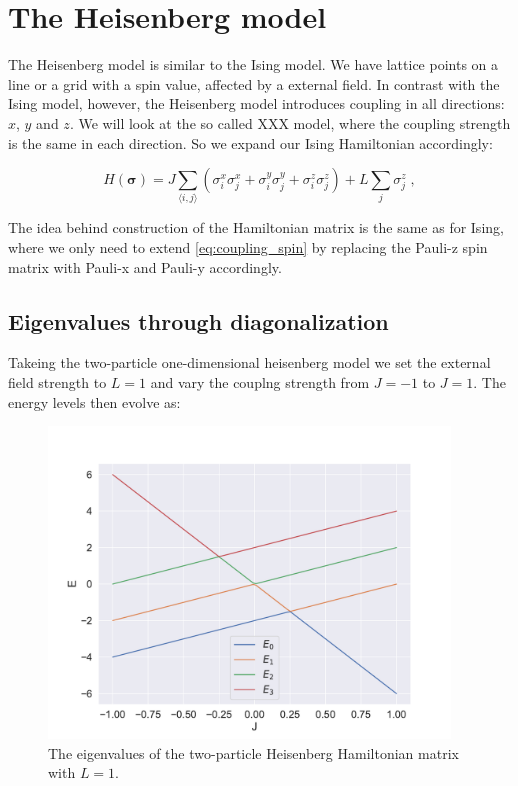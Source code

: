 \section{The Heisenberg model}

The Heisenberg model is similar to the Ising model. We have lattice points on a line or a grid with a spin value, affected by a external field. In contrast with the Ising model, however, the Heisenberg model introduces coupling in all directions: $x$, $y$ and $z$. We will look at the so called XXX model, where the coupling strength is the same in each direction. So we expand our Ising Hamiltonian accordingly:

\begin{equation}
  H(\boldsymbol{\sigma}) =J\sum_{\langle i,j\rangle} \left ( \sigma^x_i\sigma^x_j + \sigma^y_i\sigma^y_j + \sigma^z_i\sigma^z_j\right) + L \sum_j \sigma^z_j \; ,
  \label{eq:heisen_hamiltonian}
\end{equation}

The idea behind construction of the Hamiltonian matrix is the same as for Ising, where we only need to extend \ref{eq:coupling_spin} by replacing the Pauli-z spin matrix with Pauli-x and Pauli-y accordingly.

\subsection{Eigenvalues through diagonalization}

Takeing the two-particle one-dimensional heisenberg model we set the external field strength to $L = 1$ and vary the couplng strength from $J = -1$ to $J= 1$. The energy levels then evolve as:

\begin{figure}[H]
  \begin{center}
    \includegraphics[width=0.95\textwidth]{Figures/Plots/Heisen/heisen_eig_21}
  \end{center}
  \caption{The eigenvalues of the two-particle Heisenberg Hamiltonian matrix with $L = 1$.}
\end{figure}

